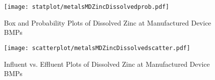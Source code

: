         \begin{figure}[hb]   %
            \centering
            \texttt{[image: statplot/metalsMDZincDissolvedprob.pdf]}
            \caption{Box and Probability Plots of Dissolved Zinc at Manufactured Device BMPs}
        \end{figure}         %
        
        
        \begin{figure}[hb]   %
            \centering
            \texttt{[image: scatterplot/metalsMDZincDissolvedscatter.pdf]}
            \caption{Influent vs. Effluent Plots of Dissolved Zinc at Manufactured Device BMPs}
        \end{figure}         %
        \clearpage
        